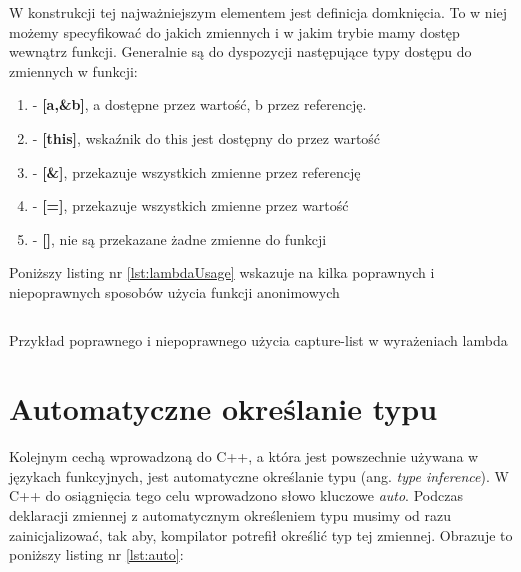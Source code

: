 \documentclass{pracamgr}
\begin{document}

W konstrukcji tej najważniejszym elementem jest definicja domknięcia. To w niej możemy 
specyfikować do jakich zmiennych i w jakim trybie mamy dostęp wewnątrz funkcji.
Generalnie są do dyspozycji następujące typy dostępu do zmiennych w funkcji:
\begin{enumerate}
\item  - \textbf{[a,&b]}, a dostępne przez wartość, b przez referencję.
\item  - \textbf{[this]}, wskaźnik do this jest dostępny do przez wartość
\item  - \textbf{[&]}, przekazuje wszystkich zmienne przez referencję
\item  - \textbf{[=]}, przekazuje wszystkich zmienne przez wartość
\item  - \textbf{[]}, nie są przekazane żadne zmienne do funkcji
\end{enumerate}

Poniższy listing nr \ref{lst:lambdaUsage} wskazuje na kilka poprawnych i niepoprawnych sposobów użycia
funkcji anonimowych

\begin{listing}[ht]
\inputminted[mathescape, linenos, numbersep=5pt, bgcolor=bg, rulecolor=\color{darkgray}, frame=lines, framesep=2mm]{cpp}{lambda1.cpp}
\caption{Przykład poprawnego i niepoprawnego użycia capture-list w wyrażeniach lambda}
\label{lst:lambdaUsage}
\end{listing}



\section{Automatyczne określanie typu}
 
Kolejnym cechą wprowadzoną do C++, a która jest powszechnie używana w językach funkcyjnych, jest automatyczne
określanie typu (ang. \textit{type inference}). W C++ do osiągnięcia tego celu wprowadzono słowo kluczowe \textit{auto}.
Podczas deklaracji zmiennej z automatycznym określeniem typu musimy od razu zainicjalizować, tak aby, kompilator 
potrefił określić typ tej zmiennej. Obrazuje to poniższy listing nr \ref{lst:auto}: 
\end{document}
